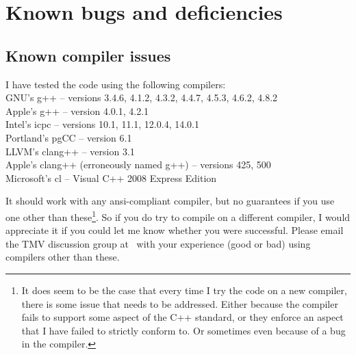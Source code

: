 
\section{Known bugs and deficiencies}
\label{Bugs}

\subsection{Known compiler issues}
\label{Install_Issues}

I have tested the code using the following compilers:\\
$\quad$\\
% 
GNU's g++ -- versions 3.4.6, 4.1.2, 4.3.2, 4.4.7, 4.5.3, 4.6.2, 4.8.2 \\
Apple's g++ -- version 4.0.1, 4.2.1 \\
Intel's icpc -- versions 10.1, 11.1, 12.0.4, 14.0.1\\
Portland's pgCC -- version 6.1\\
LLVM's clang++ -- version 3.1\\
Apple's clang++ (erroneously named g++) -- versions 425, 500\\
Microsoft's cl -- Visual C++ 2008 Express Edition\\

It should work with any ansi-compliant
compiler, but no guarantees if you use one other than these\footnote{
It does seem to be the case that 
every time I try the code on a new compiler, there is some issue that needs to be addressed.  
Either because the compiler fails to support some aspect of the C++ standard, or they enforce
an aspect that I have failed to strictly conform to.  Or sometimes even because of a bug in the compiler.}.
  So if you do try to compile on a different compiler, 
I would appreciate it if you could let me know whether you were successful.  
Please email the TMV discussion group at \mygroup\ with your experience (good or bad) using 
compilers other than these.


